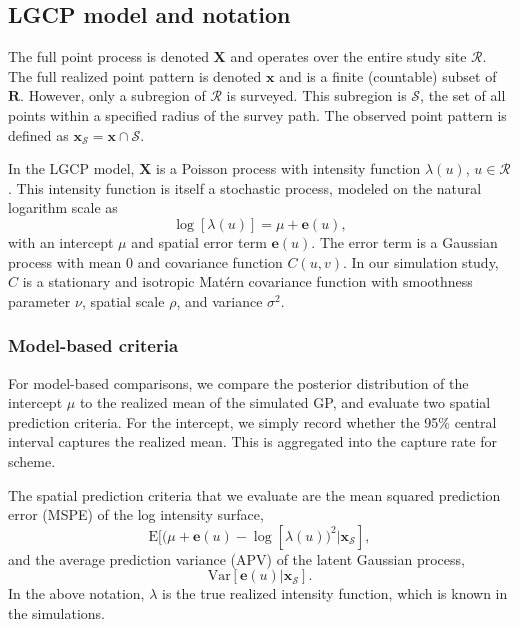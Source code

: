 \documentclass[review]{elsarticle}
\begin{document}
\subsection{LGCP model and notation}

The full point process is denoted \(\mathbf{X}\) and operates over the entire
study site \(\mathcal{R}\). The full realized point pattern is denoted
\(\mathbf{x}\) and is a finite (countable) subset of \(\mathbf{R}\). However,
only a subregion of \(\mathcal{R}\) is surveyed. This subregion is
\(\mathcal{S}\), the set of all points within a specified radius of the survey
path. The observed point pattern is defined as
\(\mathbf{x}_{\mathcal{S}} = \mathbf{x} \cap \mathcal{S}\).

In the LGCP model, \(\mathbf{X}\) is a Poisson process with intensity
function \(\lambda(u)\), \(u \in \mathcal{R}\). This intensity function is
itself a stochastic process, modeled on the natural logarithm scale as
\begin{equation}
\log[\lambda(u)] = \mu + \mathbf{e}(u),
\end{equation}
with an intercept \(\mu\) and spatial error term \(\mathbf{e}(u)\). The error
term is a Gaussian process with mean 0 and covariance function \(C(u, v)\).
In our simulation study, \(C\) is a stationary and isotropic Mat\'{e}rn
covariance function with smoothness parameter \(\nu\), spatial scale \(\rho\),
and variance \(\sigma^{2}\).


\subsubsection{Model-based criteria}

For model-based comparisons, we compare the posterior distribution of the
intercept \(\mu\) to the realized mean of the simulated GP, and evaluate two
spatial prediction criteria. For the intercept, we simply record whether the
95\% central interval captures the realized mean. This is aggregated into the
capture rate for scheme.

The spatial prediction criteria that we evaluate are the mean squared
prediction error (MSPE) of the log intensity surface,
\begin{equation}
\mathrm{E}[(\mu + \mathbf{e}(u) - \log[\lambda(u))^{2}|\mathbf{x}_{\mathcal{S}}],
\end{equation}
and the average prediction variance (APV) of the latent Gaussian process,
\begin{equation}
\mathrm{Var}[\mathbf{e}(u)|\mathbf{x}_{\mathcal{S}}].
\end{equation}
In the above notation, \(\lambda\) is the true realized intensity function,
which is known in the simulations.
\end{document}
